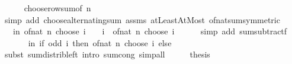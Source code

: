 \begin{isabellebody}
\ \ \ \ \isamarkupfalse%
\ choose{\isacharunderscore}{\kern0pt}row{\isacharunderscore}{\kern0pt}sum{\isacharbrackleft}{\kern0pt}of\ n{\isacharbrackright}{\kern0pt}\isanewline
\ \ \ \ \isamarkupfalse%
\ {\isacharparenleft}{\kern0pt}simp\ add{\isacharcolon}{\kern0pt}\ choose{\isacharunderscore}{\kern0pt}alternating{\isacharunderscore}{\kern0pt}sum\ assms\ atLeast{}AtMost\ of{\isacharunderscore}{\kern0pt}nat{\isacharunderscore}{\kern0pt}sum{\isacharbrackleft}{\kern0pt}symmetric{\isacharbrackright}{\kern0pt}{\isacharparenright}{\kern0pt}\isanewline
\ \ \isamarkupfalse%
\ \isamarkupfalse%
\ {\isachardoublequoteopen}{\isasymdots}\ {\isacharequal}{\kern0pt}\ {\isacharparenleft}{\kern0pt}{\isasymSum}i{\isasymle}n{\isachardot}{\kern0pt}\ of{\isacharunderscore}{\kern0pt}nat\ {\isacharparenleft}{\kern0pt}n\ choose\ i{\isacharparenright}{\kern0pt}\ {\isacharminus}{\kern0pt}\ {\isacharparenleft}{\kern0pt}{\isacharminus}{\kern0pt}{}{\isacharparenright}{\kern0pt}\ {\isacharcircum}{\kern0pt}\ i\ {\isacharasterisk}{\kern0pt}\ of{\isacharunderscore}{\kern0pt}nat\ {\isacharparenleft}{\kern0pt}n\ choose\ i{\isacharparenright}{\kern0pt}{\isacharparenright}{\kern0pt}{\isachardoublequoteclose}\isanewline
\ \ \ \ \isamarkupfalse%
\ {\isacharparenleft}{\kern0pt}simp\ add{\isacharcolon}{\kern0pt}\ sum{\isacharunderscore}{\kern0pt}subtractf{\isacharparenright}{\kern0pt}\isanewline
\ \ \isamarkupfalse%
\ \isamarkupfalse%
\ {\isachardoublequoteopen}{\isasymdots}\ {\isacharequal}{\kern0pt}\ {}\ {\isacharasterisk}{\kern0pt}\ {\isacharparenleft}{\kern0pt}{\isasymSum}i{\isasymle}n{\isachardot}{\kern0pt}\ if\ odd\ i\ then\ of{\isacharunderscore}{\kern0pt}nat\ {\isacharparenleft}{\kern0pt}n\ choose\ i{\isacharparenright}{\kern0pt}\ else\ {}{\isacharparenright}{\kern0pt}{\isachardoublequoteclose}\isanewline
\ \ \ \ \isamarkupfalse%
\ {\isacharparenleft}{\kern0pt}subst\ sum{\isacharunderscore}{\kern0pt}distrib{\isacharunderscore}{\kern0pt}left{\isacharcomma}{\kern0pt}\ intro\ sum{\isachardot}{\kern0pt}cong{\isacharparenright}{\kern0pt}\ simp{\isacharunderscore}{\kern0pt}all\isanewline
\ \ \isamarkupfalse%
\ \isamarkupfalse%
\ {\isacharquery}{\kern0pt}thesis\ \isacommand{{\isachardot}{\kern0pt}{\isachardot}{\kern0pt}}\isamarkupfalse%
\isanewline
{}\isamarkupfalse%
%
\endisatagproof
{\isafoldproof}%
%
\isadelimproof
%
\endisadelimproof
%
\begin{isamarkuptext}%

\end{isamarkuptext}
\end{isabellebody}
